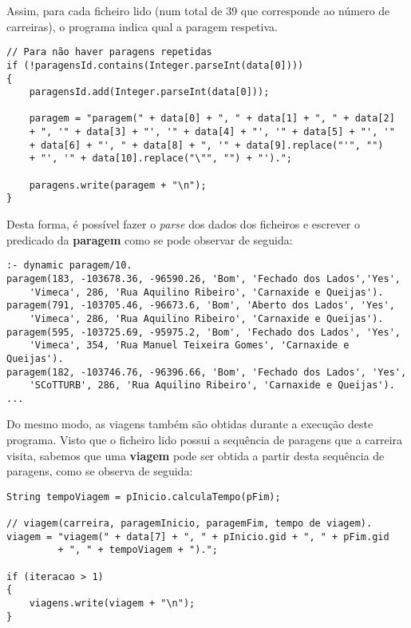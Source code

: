 \documentclass[a4paper,12pt]{report}
\begin{document}
\vspace{0.5cm}

\par Assim, para cada ficheiro lido (num total de 39 que corresponde ao número de carreiras), o programa indica qual a paragem respetiva. 

\vspace{1cm}

\begin{verbatim}
// Para não haver paragens repetidas
if (!paragensId.contains(Integer.parseInt(data[0])))
{
    paragensId.add(Integer.parseInt(data[0]));

    paragem = "paragem(" + data[0] + ", " + data[1] + ", " + data[2]
    + ", '" + data[3] + "', '" + data[4] + "', '" + data[5] + "', '"
    + data[6] + "', " + data[8] + ", '" + data[9].replace("'", "")
    + "', '" + data[10].replace("\"", "") + "').";

    paragens.write(paragem + "\n");
}
\end{verbatim}

\vspace{0.5cm}

Desta forma, é possível fazer o \textit{parse} dos dados dos ficheiros e escrever o predicado da \textbf{paragem} como se pode observar de seguida:

\begin{verbatim}
:- dynamic paragem/10. 
paragem(183, -103678.36, -96590.26, 'Bom', 'Fechado dos Lados','Yes',
    'Vimeca', 286, 'Rua Aquilino Ribeiro', 'Carnaxide e Queijas').
paragem(791, -103705.46, -96673.6, 'Bom', 'Aberto dos Lados', 'Yes',
    'Vimeca', 286, 'Rua Aquilino Ribeiro', 'Carnaxide e Queijas').
paragem(595, -103725.69, -95975.2, 'Bom', 'Fechado dos Lados', 'Yes',
    'Vimeca', 354, 'Rua Manuel Teixeira Gomes', 'Carnaxide e Queijas').
paragem(182, -103746.76, -96396.66, 'Bom', 'Fechado dos Lados', 'Yes',
    'SCoTTURB', 286, 'Rua Aquilino Ribeiro', 'Carnaxide e Queijas').
...
\end{verbatim}

\vspace{5cm}

\par Do mesmo modo, as viagens também são obtidas durante a execução deste programa. Visto que o ficheiro lido possui a sequência de paragens que a carreira visita, sabemos que uma \textbf{viagem} pode ser obtida a partir desta sequência de paragens, como se observa de seguida:

\begin{verbatim}
String tempoViagem = pInicio.calculaTempo(pFim);

// viagem(carreira, paragemInicio, paragemFim, tempo de viagem).
viagem = "viagem(" + data[7] + ", " + pInicio.gid + ", " + pFim.gid
         + ", " + tempoViagem + ").";

if (iteracao > 1)
{
    viagens.write(viagem + "\n");
}
\end{verbatim}
\end{document}
